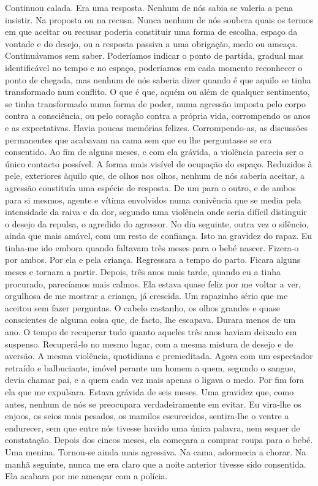 Continuou calada. Era uma resposta. Nenhum de nós sabia se valeria a
pena insistir. Na proposta ou na recusa. Nunca nenhum de nós soubera
quais os termos em que aceitar ou recusar poderia constituir uma forma
de escolha, espaço da vontade e do desejo, ou a resposta passiva a uma
obrigação, medo ou ameaça. Continuávamos sem saber. Poderíamos indicar o
ponto de partida, gradual mas identificável no tempo e no espaço,
poderíamos em cada momento reconhecer o ponto de chegada, mas nenhum de
nós saberia dizer quando é que aquilo se tinha transformado num
conflito. O que é que, aquém ou além de qualquer sentimento, se tinha
transformado numa forma de poder, numa agressão imposta pelo corpo
contra a consciência, ou pelo coração contra a própria vida, corrompendo
os anos e as expectativas. Havia poucas memórias felizes.
Corrompendo­‑as, as discussões permanentes que acabavam na cama sem que
eu lhe perguntasse se era consentido. Ao fim de alguns meses, e com ela
grávida, a violência parecia ser o único contacto possível. A forma mais
visível de ocupação do espaço. Reduzidos à pele, exteriores àquilo que,
de olhos nos olhos, nenhum de nós saberia aceitar, a agressão constituía
uma espécie de resposta. De um para o outro, e de ambos para si mesmos,
agente e vítima envolvidos numa conivência que se media pela intensidade
da raiva e da dor, segundo uma violência onde seria difícil distinguir o
desejo da repulsa, o agredido do agressor. No dia seguinte, outra vez o
silêncio, ainda que mais amável, com um resto de confiança. Isto na
gravidez do rapaz. Eu tinha­‑me ido embora quando faltavam três meses
para o bebé nascer. Fizera­‑o por ambos. Por ela e pela criança.
Regressara a tempo do parto. Ficara alguns meses e tornara a partir.
Depois, três anos mais tarde, quando eu a tinha procurado, parecíamos
mais calmos. Ela estava quase feliz por me voltar a ver, orgulhosa de me
mostrar a criança, já crescida. Um rapazinho sério que me aceitou sem
fazer perguntas. O cabelo castanho, os olhos grandes e quase conscientes
de alguma coisa que, de facto, lhe escapava. Durara menos de um ano. O
tempo de recuperar tudo quanto aqueles três anos haviam deixado em
suspenso. Recuperá­‑lo no mesmo lugar, com a mesma mistura de desejo e
de aversão. A mesma violência, quotidiana e premeditada. Agora com um
espectador retraído e balbuciante, imóvel perante um homem a quem,
segundo o sangue, devia chamar pai, e a quem cada vez mais apenas o
ligava o medo. Por fim fora ela que me expulsara. Estava grávida de seis
meses. Uma gravidez que, como antes, nenhum de nós se preocupara
verdadeiramente em evitar. Eu vira­‑lhe os enjoos, os seios mais
pesados, os mamilos escurecidos, sentira­‑lhe o ventre a endurecer, sem
que entre nós tivesse havido uma única palavra, nem sequer de
constatação. Depois dos cincos meses, ela começara a comprar roupa para
o bebé. Uma menina. Tornou­‑se ainda mais agressiva. Na cama, adormecia
a chorar. Na manhã seguinte, nunca me era claro que a noite anterior
tivesse sido consentida. Ela acabara por me ameaçar com a polícia.

